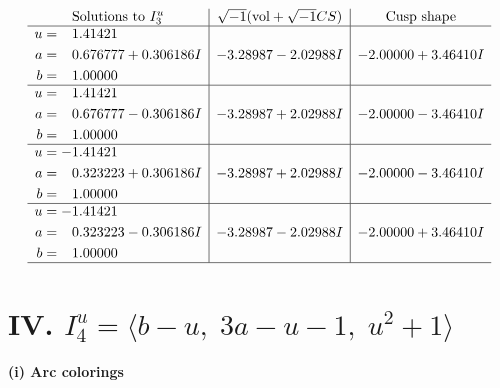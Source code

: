 \documentclass[1p]{elsarticle_modified}
\theoremstyle{definition}
\newcommand{\I}{\sqrt{-1}}
\begin{document}
$$\begin{array}{c|c|c}  
\text{Solutions to }I^u_{3}& \I (\text{vol} + \sqrt{-1}CS) & \text{Cusp shape}\\
 \hline 
\begin{aligned}
u &= \phantom{-}1.41421\phantom{ +0.000000I} \\
a &= \phantom{-}0.676777 + 0.306186 I \\
b &= \phantom{-}1.00000\phantom{ +0.000000I}\end{aligned}
 & -3.28987 - 2.02988 I & -2.00000 + 3.46410 I \\ \hline\begin{aligned}
u &= \phantom{-}1.41421\phantom{ +0.000000I} \\
a &= \phantom{-}0.676777 - 0.306186 I \\
b &= \phantom{-}1.00000\phantom{ +0.000000I}\end{aligned}
 & -3.28987 + 2.02988 I & -2.00000 - 3.46410 I \\ \hline\begin{aligned}
u &= -1.41421\phantom{ +0.000000I} \\
a &= \phantom{-}0.323223 + 0.306186 I \\
b &= \phantom{-}1.00000\phantom{ +0.000000I}\end{aligned}
 & -3.28987 + 2.02988 I & -2.00000 - 3.46410 I \\ \hline\begin{aligned}
u &= -1.41421\phantom{ +0.000000I} \\
a &= \phantom{-}0.323223 - 0.306186 I \\
b &= \phantom{-}1.00000\phantom{ +0.000000I}\end{aligned}
 & -3.28987 - 2.02988 I & -2.00000 + 3.46410 I\\
 \hline 
 \end{array}$$\newpage\newpage\renewcommand{\arraystretch}{1}
\centering \section*{IV. $I^u_{4}= \langle b- u,\;3 a- u-1,\;u^2+1 \rangle$}
\flushleft \textbf{(i) Arc colorings}\\
\end{document}
